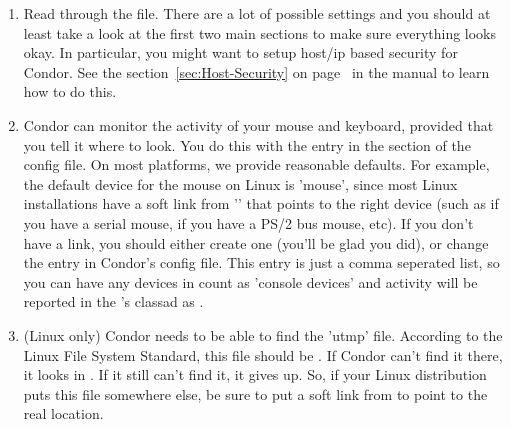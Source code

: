 \begin{enumerate}
\item Read through the  file.  There are a
    lot of possible settings and you should at least take a look at
    the first two main sections to make sure everything looks okay.
    In particular, you might want to setup host/ip based security for
    Condor.  See the section~\ref{sec:Host-Security} on
    page~\pageref{sec:Host-Security} in the manual to learn how to do
    this.

\item Condor can monitor the activity of your mouse and keyboard,
    provided that you tell it where to look.  You do this with the
     entry in the  section of
    the config file.  On most platforms, we provide reasonable
    defaults.  For example, the default device for the mouse on Linux
    is 'mouse', since most Linux installations have a soft link from
    '' that points to the right device (such as
     if you have a serial mouse,  if you have
    a PS/2 bus mouse, etc).  If you don't have a 
    link, you should either create one (you'll be glad you did), or
    change the  entry in Condor's config file.
    This entry is just a comma seperated list, so you can have any
    devices in  count as 'console devices' and activity
    will be reported in the 's classad as
    .

\item   (Linux only) Condor needs to be able to find the 'utmp' file.
    According to the Linux File System Standard, this file should be
    .  If Condor can't find it there, it looks in
    .  If it still can't find it, it gives up.  So, if
    your Linux distribution puts this file somewhere else, be sure to
    put a soft link from  to point to the real location.


\end{enumerate}
